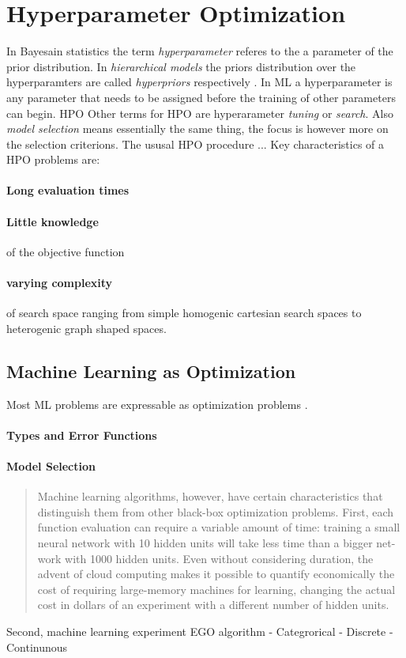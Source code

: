 \documentclass[english]{article}
\begin{document}
\section{Hyperparameter Optimization}
In Bayesain statistics the term \textit{hyperparameter} referes to the a parameter of the prior distribution. In \textit{hierarchical models} the priors distribution over the hyperparamters are called \textit{hyperpriors} respectively \cite[p.408]{bishop_neural_1995}. In \acf{ML} a hyperparameter is any parameter that needs to be assigned before the training of other parameters can begin.
\acf{HPO} Other terms for \ac{HPO} are hyperarameter \textit{tuning} or \textit{search}. Also \textit{model selection} means essentially the same thing, the focus is however more on the selection criterions.
The ususal \ac{HPO} procedure ...
Key characteristics of a \ac{HPO} problems are:
\paragraph{Long evaluation times}
\paragraph{Little knowledge} of the objective function
\paragraph{varying complexity} of search space ranging from simple homogenic cartesian search spaces to heterogenic graph shaped spaces.

\subsection{Machine Learning as Optimization}



Most \acf{ML} problems are expressable as optimization problems \cite{bennett_interplay_2006}.

\paragraph{Types and Error Functions}


\paragraph{Model Selection}



\begin{quote}
Machine learning algorithms, however, have certain characteristics that distinguish them from other black-box optimization problems.  First, each function evaluation can require a variable amount of time:  training a small neural network with 10 hidden units will take less time than a bigger net-work with 1000 hidden units.  Even without considering duration, the advent of cloud computing makes it possible to quantify economically the cost of requiring large-memory machines for learning, changing the actual cost in dollars of an experiment with a different number of hidden units.
\end{quote}
Second, machine learning experiment EGO algorithm
 - Categrorical
 - Discrete
 - Continunous
\end{document}
